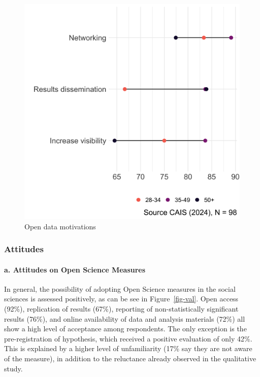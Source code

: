\documentclass[
  letterpaper,
  DIV=11,
  numbers=noendperiod]{scrartcl}
\let\oldparagraph\paragraph
\renewcommand{\paragraph}[1]{\oldparagraph{#1}\mbox{}}
\begin{document}
\begin{figure}
\begin{minipage}[t]{0.50\linewidth}
{{\includegraphics{paper_files/figure-pdf/fig-motivaciones-grid-2.png}

}

}

\end{minipage}%

\caption{\label{fig-motivaciones-grid}Open data motivations}

\end{figure}

\hypertarget{attitudes}{%
\subsubsection{Attitudes}\label{attitudes}}

\hypertarget{a.-attitudes-on-open-science-measures}{%
\paragraph{a. Attitudes on Open Science
Measures}\label{a.-attitudes-on-open-science-measures}}

In general, the possibility of adopting Open Science measures in the
social sciences is assessed positively, as can be see in
Figure~\ref{fig-val}. Open access (92\%), replication of results (67\%),
reporting of non-statistically significant results (76\%), and online
availability of data and analysis materials (72\%) all show a high level
of acceptance among respondents. The only exception is the
pre-registration of hypothesis, which received a positive evaluation of
only 42\%. This is explained by a higher level of unfamiliarity (17\%
say they are not aware of the measure), in addition to the reluctance
already observed in the qualitative study.
\end{document}
